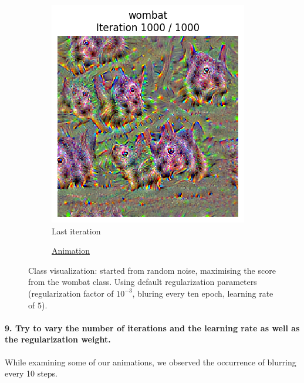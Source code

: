 \begin{figure}[H]
    \centering
    \begin{subfigure}{.5\textwidth}
        \centering
        \includegraphics[width=.7\linewidth]{SqueezeNet/wombat_animated_1000_last_frame.png}
        \caption{Last iteration}
        \label{fig:class_viz_wombat:png}
    \end{subfigure}%
    \begin{subfigure}{.5\textwidth}
        \centering
        \caption{\href{figs/2b/SqueezeNet/wombat_animated_1000.mp4}{Animation}}
        \label{fig:class_viz_wombat:vid}
    \end{subfigure}
    \caption{Class visualization: started from random noise, maximising the score from the wombat class. Using default regularization parameters (regularization factor of $10^{-3}$, bluring every ten epoch, learning rate of $5$).}
    \label{fig:class_viz_wombat}
\end{figure}

\paragraph*{9. Try to vary the number of iterations and the learning rate as well as the regularization weight.}
While examining some of our animations, we observed the occurrence of blurring every 10 steps.

